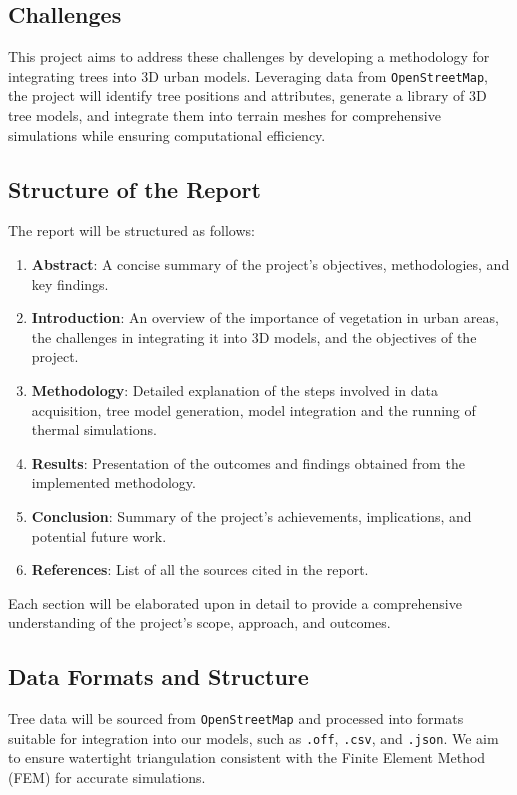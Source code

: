 \documentclass[12pt]{article}
\begin{document}
\newpage

\subsection{Challenges}
This project aims to address these challenges by developing a methodology for 
integrating trees into 3D urban models. Leveraging data from \texttt{OpenStreetMap},
the  project will identify tree positions and attributes, generate a library of 3D tree 
models, and integrate them into terrain meshes for comprehensive simulations while
ensuring computational efficiency.

\subsection{Structure of the Report}

The report will be structured as follows:

\begin{enumerate}
    \item \textbf{Abstract}: A concise summary of the project's objectives, methodologies, 
    and key findings.
    
    \item \textbf{Introduction}: An overview of the importance of vegetation in urban areas, 
    the challenges in integrating it into 3D models, and the objectives of the project.
    
    \item \textbf{Methodology}: Detailed explanation of the steps involved in data acquisition, 
    tree model generation, model integration and the running of thermal simulations.
    
    \item \textbf{Results}: Presentation of the outcomes and findings obtained from the 
    implemented methodology.
    
    \item \textbf{Conclusion}: Summary of the project's achievements, implications, and 
    potential future work.
    
    \item \textbf{References}: List of all the sources cited in the report.
\end{enumerate}

Each section will be elaborated upon in detail to provide a comprehensive understanding 
of the project's scope, approach, and outcomes.


\subsection{Data Formats and Structure}
Tree data will be sourced from \texttt{OpenStreetMap} and processed into formats suitable for 
integration into our models, such as \texttt{.off}, \texttt{.csv}, and \texttt{.json}.
We aim to ensure watertight triangulation consistent with the Finite Element Method
(FEM) for accurate simulations.  
\end{document}
